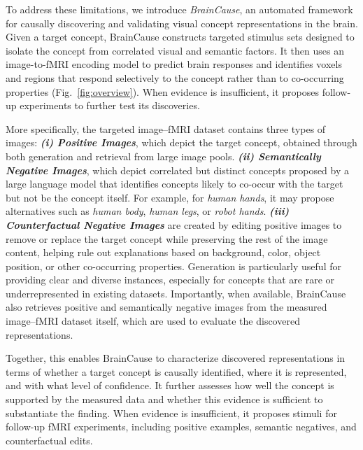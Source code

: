 \documentclass{article}
\begin{document}
To address these limitations, we introduce \emph{BrainCause}, an automated framework for causally discovering and validating visual concept representations in the brain. Given a target concept, BrainCause constructs targeted stimulus sets designed to isolate the concept from correlated visual and semantic factors. It then uses an image-to-fMRI encoding model to predict brain responses and identifies voxels and regions that respond selectively to the concept rather than to co-occurring properties (Fig.~\ref{fig:overview}). When evidence is insufficient, it proposes follow-up experiments to further test its discoveries.

More specifically, the targeted image--fMRI dataset contains three types of images: \emph{\textbf{(i) Positive Images}}, which depict the target concept, obtained through both generation and retrieval from large image pools. \emph{\textbf{(ii) Semantically Negative Images}}, which depict correlated but distinct concepts proposed by a large language model that identifies concepts likely to co-occur with the target but not be the concept itself. For example, for \emph{human hands}, it may propose alternatives such as \emph{human body}, \emph{human legs}, or \emph{robot hands}. \emph{\textbf{(iii) Counterfactual Negative Images}} are created by editing positive images to remove or replace the target concept while preserving the rest of the image content, helping rule out explanations based on background, color, object position, or other co-occurring properties. Generation is particularly useful for providing clear and diverse instances, especially for concepts that are rare or underrepresented in existing datasets. Importantly, when available, BrainCause also retrieves positive and semantically negative images from the measured image--fMRI dataset itself, which are used to evaluate the discovered representations.

Together, this enables BrainCause to characterize discovered representations in terms of whether a target concept is causally identified, where it is represented, and with what level of confidence. It further assesses how well the concept is supported by the measured data and whether this evidence is sufficient to substantiate the finding. When evidence is insufficient, it proposes stimuli for follow-up fMRI experiments, including positive examples, semantic negatives, and counterfactual edits.
\end{document}
